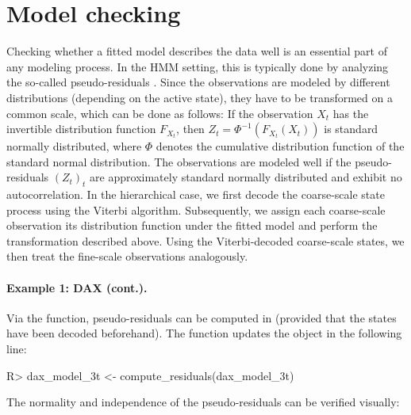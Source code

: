\documentclass[article]{jss}
\newcommand{\fct}[1]{\code{#1()}}
\begin{document}
\section{Model checking} \label{sec:model_checking} %

Checking whether a fitted model describes the data well is an essential part of any modeling process. In the HMM setting, this is typically done by analyzing the so-called pseudo-residuals \citep{zuc16}. Since the observations are modeled by different distributions (depending on the active state), they have to be transformed on a common scale, which can be done as follows: If the observation $X_t$ has the invertible distribution function $F_{X_t}$, then $Z_t=\Phi^{-1}(F_{X_t} (X_t))$ is standard normally distributed, where $\Phi$ denotes the cumulative distribution function of the standard normal distribution. The observations are modeled well if the pseudo-residuals $(Z_t)_t$ are approximately standard normally distributed and exhibit no autocorrelation. In the hierarchical case, we first decode the coarse-scale state process using the Viterbi algorithm. Subsequently, we assign each coarse-scale observation its distribution function under the fitted model and perform the transformation described above. Using the Viterbi-decoded coarse-scale states, we then treat the fine-scale observations analogously.

\paragraph{Example 1: DAX (cont.).}

Via the \fct{compute\_residuals} function, pseudo-residuals can be computed in  (provided that the states have been decoded beforehand). The function updates the  object in the following line:

%
\begin{Schunk}
\begin{Sinput}
R> dax_model_3t <- compute_residuals(dax_model_3t)
\end{Sinput}
\end{Schunk}
%

The normality and independence of the pseudo-residuals can be verified visually:
\end{document}
